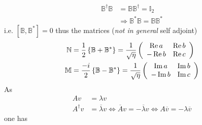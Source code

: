 \documentclass[aps,preprint]{revtex4}%
\begin{document}
\begin{align}
\mathbb{B}^{\dagger}\mathbb{B}  & =\mathbb{BB}^{\dagger}=\mathbb{I}%
_{2}\nonumber\\
& \Rightarrow\mathbb{B}^{\ast}\mathbb{B}=\mathbb{BB}^{\ast}%
\end{align}
i.e. $\left[  \mathbb{B},\mathbb{B}^{\ast}\right]  =0$ thus the matrices
(\emph{not in general} self adjoint)
\begin{align}
\mathbb{N}  & =\frac{1}{2}\left\{  \mathbb{B}+\mathbb{B}^{\ast}\right\}
=\frac{1}{\sqrt{\eta}}\left(
\begin{array}
[c]{cc}%
\operatorname{Re}a & \operatorname{Re}b\\
-\operatorname{Re}b & \operatorname{Re}c
\end{array}
\right)  \nonumber\\
\mathbb{M}  & =\frac{-i}{2}\left\{  \mathbb{B}-\mathbb{B}^{\ast}\right\}
=\frac{1}{\sqrt{\eta}}\left(
\begin{array}
[c]{cc}%
\operatorname{Im}a & \operatorname{Im}b\\
-\operatorname{Im}b & \operatorname{Im}c
\end{array}
\right)
\end{align}
As
\begin{align}
Av  & =\lambda v\\
A^{\dagger}v  & =\overline{\lambda}v\Leftrightarrow\overline{A}v=-\overline
{\lambda}v\Leftrightarrow A\overline{v}=-\lambda\overline{v}%
\end{align}
one has
\end{document}
